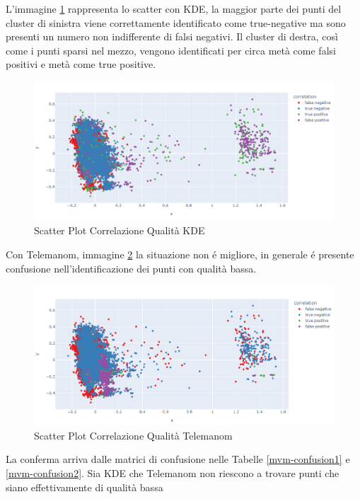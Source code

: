 L'immagine \ref{kde_quality} rappresenta lo scatter con KDE, la maggior parte dei punti del cluster di sinistra viene correttamente identificato come true-negative ma sono presenti un numero non indifferente di falsi negativi. Il cluster di destra, così come i punti sparsi nel mezzo, vengono identificati per circa metà come falsi positivi e metà come true positive.
\begin{figure}[t]
	\centering
	\includegraphics[width=14cm, scale=1]{images/correlation_ssb1_quality_plot.png}
	\caption{Scatter Plot Correlazione Qualità KDE}
	\label{kde_quality}
\end{figure}

Con Telemanom, immagine \ref{worst_clf_quality} la situazione non é migliore, in generale é presente confusione nell'identificazione dei punti con qualità bassa.


\begin{figure}[t]
	\centering
	\includegraphics[width=14cm, scale=1]{images/worst_correlation_ssb1_quality_plot}
	\caption{Scatter Plot Correlazione Qualità Telemanom}
	\label{worst_clf_quality}
\end{figure}

La conferma arriva dalle matrici di confusione nelle Tabelle \ref{mvm-confusion1} e \ref{mvm-confusion2}. Sia KDE che Telemanom non riescono a trovare punti che siano effettivamente di qualità bassa



